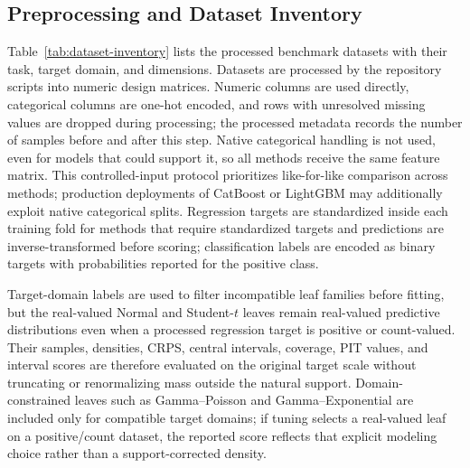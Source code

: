 \subsection{Preprocessing and Dataset Inventory}\label{app:dataset-inventory}
Table~\ref{tab:dataset-inventory} lists the processed benchmark datasets with their task, target domain, and dimensions. Datasets are processed by the repository scripts into numeric design matrices. Numeric columns are used directly, categorical columns are one-hot encoded, and rows with unresolved missing values are dropped during processing; the processed metadata records the number of samples before and after this step. Native categorical handling is not used, even for models that could support it, so all methods receive the same feature matrix. This controlled-input protocol prioritizes like-for-like comparison across methods; production deployments of CatBoost or LightGBM may additionally exploit native categorical splits. Regression targets are standardized inside each training fold for methods that require standardized targets and predictions are inverse-transformed before scoring; classification labels are encoded as binary targets with probabilities reported for the positive class.

Target-domain labels are used to filter incompatible leaf families before fitting, but the real-valued Normal and Student-$t$ leaves remain real-valued predictive distributions even when a processed regression target is positive or count-valued. Their samples, densities, CRPS, central intervals, coverage, PIT values, and interval scores are therefore evaluated on the original target scale without truncating or renormalizing mass outside the natural support. Domain-constrained leaves such as Gamma--Poisson and Gamma--Exponential are included only for compatible target domains; if tuning selects a real-valued leaf on a positive/count dataset, the reported score reflects that explicit modeling choice rather than a support-corrected density.

